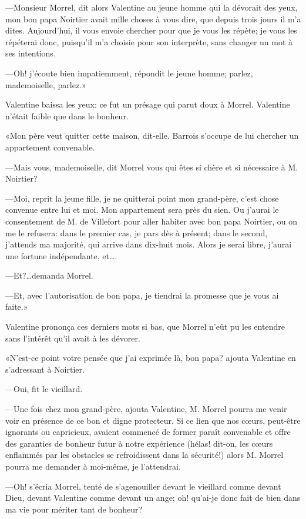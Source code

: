 —Monsieur Morrel, dit alors Valentine au jeune homme qui la dévorait des yeux, mon bon papa Noirtier avait mille choses à vous dire, que depuis trois jours il m'a dites. Aujourd'hui, il vous envoie chercher pour que je vous les répète; je vous les répéterai donc, puisqu'il m'a choisie pour son interprète, sans changer un mot à ses intentions. 

—Oh! j'écoute bien impatiemment, répondit le jeune homme; parlez, mademoiselle, parlez.» 

Valentine baissa les yeux: ce fut un présage qui parut doux à Morrel. Valentine n'était faible que dans le bonheur. 

«Mon père veut quitter cette maison, dit-elle. Barrois s'occupe de lui chercher un appartement convenable. 

—Mais vous, mademoiselle, dit Morrel vous qui êtes si chère et si nécessaire à M. Noirtier? 

—Moi, reprit la jeune fille, je ne quitterai point mon grand-père, c'est chose convenue entre lui et moi. Mon appartement sera près du sien. Ou j'aurai le consentement de M. de Villefort pour aller habiter avec bon papa Noirtier, ou on me le refusera: dans le premier cas, je pars dès à présent; dans le second, j'attends ma majorité, qui arrive dans dix-huit mois. Alors je serai libre, j'aurai une fortune indépendante, et\dots. 

—Et?\dots demanda Morrel. 

—Et, avec l'autorisation de bon papa, je tiendrai la promesse que je vous ai faite.»  

Valentine prononça ces derniers mots si bas, que Morrel n'eût pu les entendre sans l'intérêt qu'il avait à les dévorer. 

«N'est-ce point votre pensée que j'ai exprimée là, bon papa? ajouta Valentine en s'adressant à Noirtier. 

—Oui, fit le vieillard. 

—Une fois chez mon grand-père, ajouta Valentine, M. Morrel pourra me venir voir en présence de ce bon et digne protecteur. Si ce lien que nos cœurs, peut-être ignorants ou capricieux, avaient commencé de former paraît convenable et offre des garanties de bonheur futur à notre expérience (hélas! dit-on, les cœurs enflammés par les obstacles se refroidissent dans la sécurité!) alors M. Morrel pourra me demander à moi-même, je l'attendrai. 

—Oh! s'écria Morrel, tenté de s'agenouiller devant le vieillard comme devant Dieu, devant Valentine comme devant un ange; oh! qu'ai-je donc fait de bien dans ma vie pour mériter tant de bonheur? 

